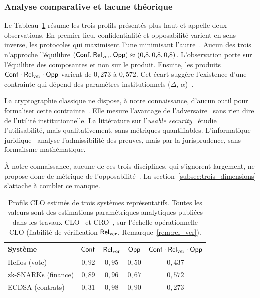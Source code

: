 \subsubsection{Analyse comparative et lacune th\'eorique}
\label{subsubsec:analyse_comparative}
\begin{sloppypar}
Le Tableau~\ref{tab:clo_resume_ch1} r\'esume les trois profils pr\'esent\'es plus haut
et appelle deux observations. En premier lieu, confidentialit\'e et opposabilit\'e
varient en sens inverse, les protocoles qui maximisent l'une minimisant
l'autre~\cite{ClarksonSchneider10}. Aucun des trois n'approche l'\'equilibre $(\mathsf{Conf}, \mathsf{Rel}_{\mathrm{ver}}, \mathsf{Opp})
\approx (0{,}8, 0{,}8, 0{,}8)$. L'observation porte sur l'\'equilibre des
composantes et non sur le produit. Ensuite, les produits $\mathsf{Conf} \cdot \mathsf{Rel}_{\mathrm{ver}} \cdot \mathsf{Opp}$ varient de
$0{,}273$ \`a $0{,}572$. Cet \'ecart sugg\`ere l'existence d'une contrainte
qui d\'epend des param\`etres
institutionnels ($\Delta$, $\alpha$)~\cite{Simon82,Cowan2001}.

La cryptographie classique ne dispose, \`a notre connaissance, d'aucun outil pour formaliser cette
contrainte~\cite{AbadiRogaway00}. Elle mesure l'avantage de l'adversaire~\cite{Goldreich01} sans rien dire de l'utilit\'e institutionnelle. La litt\'erature sur l'\emph{usable
security}~\cite{Bonneau12,Cranor05,Herley09,Dhamija06,Schechter07} \'etudie l'utilisabilit\'e, mais
qualitativement, sans m\'etriques quantifiables. L'informatique
juridique~\cite{Kerr04,Casey11,Mason07} analyse l'admissibilit\'e des preuves,
mais par la jurisprudence, sans formalisme math\'ematique.

\`A notre connaissance, aucune de ces trois disciplines, qui s'ignorent largement, ne propose donc de
m\'etrique de l'opposabilit\'e~\cite{Smith09,Alvim12}. La section~\ref{subsec:trois_dimensions} s'attache \`a combler ce manque.
\end{sloppypar}

\begin{table}[htbp]
\centering
\caption{Profils CLO estimés de trois systèmes représentatifs.
Toutes les valeurs sont des estimations paramétriques analytiques publiées
dans les travaux CLO~\cite{MINKA2026CLO} et CRO~\cite{MINKA2026CRO}, sur l'\'echelle
op\'erationnelle CLO (fiabilit\'e de v\'erification $\mathsf{Rel}_{\mathrm{ver}}$, Remarque~\ref{rem:rel_ver}).}
\label{tab:clo_resume_ch1}
\begin{tabular}{lcccc}
\toprule
\textbf{Système} & $\mathsf{Conf}$ & $\mathsf{Rel}_{\mathrm{ver}}$ & $\mathsf{Opp}$ & $\mathsf{Conf} \cdot \mathsf{Rel}_{\mathrm{ver}} \cdot \mathsf{Opp}$ \\
\midrule
Helios (vote)        & $0{,}92$ & $0{,}95$ & $0{,}50$ & $0{,}437$ \\
zk-SNARKs (finance) & $0{,}89$ & $0{,}96$ & $0{,}67$ & $0{,}572$ \\
ECDSA (contrats)    & $0{,}31$ & $0{,}98$ & $0{,}90$ & $0{,}273$ \\
\bottomrule
\end{tabular}
\end{table}

